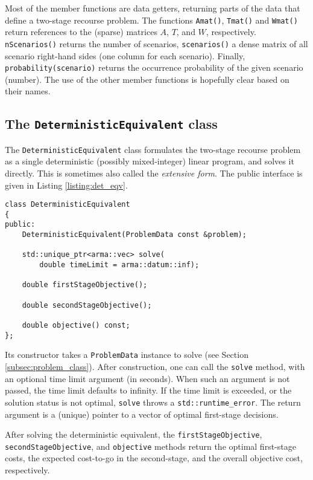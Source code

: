 \documentclass[12pt, english]{article}
\begin{document}
Most of the member functions are data getters, returning parts of the data that define a two-stage recourse problem. The functions \texttt{Amat()}, \texttt{Tmat()} and \texttt{Wmat()} return references to the (sparse) matrices $A$, $T$, and $W$, respectively. \texttt{nScenarios()} returns the number of scenarios, \texttt{scenarios()} a dense matrix of all scenario right-hand sides (one column for each scenario). Finally, \texttt{probability(scenario)} returns the occurrence probability of the given scenario (number). The use of the other member functions is hopefully clear based on their names.

\subsection{The \texttt{DeterministicEquivalent} class}
\label{subsec:det_eqv_class}

The \texttt{DeterministicEquivalent} class formulates the two-stage recourse problem as a single deterministic (possibly mixed-integer) linear program, and solves it directly. This is sometimes also called the \textit{extensive form}. The public interface is given in Listing \ref{listing:det_eqv}.
\begin{lstlisting}[caption={Public interface of the \texttt{DeterministicEquivalent} class.},
                   label={listing:det_eqv}]
class DeterministicEquivalent
{
public:
	DeterministicEquivalent(ProblemData const &problem);
	
	std::unique_ptr<arma::vec> solve(
		double timeLimit = arma::datum::inf);
	
	double firstStageObjective();
	
	double secondStageObjective();
	
	double objective() const;
};
\end{lstlisting}
Its constructor takes a \texttt{ProblemData} instance to solve (see Section \ref{subsec:problem_class}). After construction, one can call the \texttt{solve} method, with an optional time limit argument (in seconds). When such an argument is not passed, the time limit defaults to infinity. If the time limit is exceeded, or the solution status is not optimal, \texttt{solve} throws a \texttt{std::runtime\_error}. The return argument is a (unique) pointer to a
vector of optimal first-stage decisions.

After solving the deterministic equivalent, the \texttt{firstStageObjective}, \texttt{secondStageObjective}, and \texttt{objective} methods return the optimal first-stage costs, the expected cost-to-go in the second-stage, and the overall objective cost, respectively.
\end{document}
